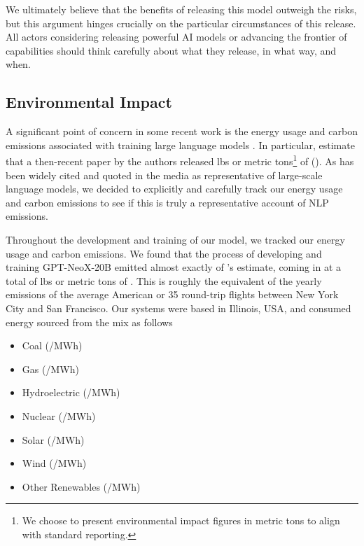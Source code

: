 \documentclass[11pt]{article}
\newcommand{\model}{GPT-NeoX-20B}
\begin{document}
We ultimately believe that the benefits of releasing this model outweigh the risks, but this argument hinges crucially on the particular circumstances of this release. All actors considering releasing powerful AI models or advancing the frontier of capabilities should think carefully about what they release, in what way, and when. 

\subsection{Environmental Impact}
\label{subsec:environmental-impact}

A significant point of concern in some recent work is the energy usage and carbon emissions associated with training large language models \citep{strubell2019energy,schwartz2020green,lacoste2019quantifying,bender2021dangers}. In particular, \citet{strubell2019energy} estimate that a then-recent paper by the authors released  lbs or  metric tons\footnote{We choose to present environmental impact figures in metric tons to align with standard reporting.} of  (). As \citet{strubell2019energy} has been widely cited and quoted in the media as representative of large-scale language models, we decided to explicitly and carefully track our energy usage and carbon emissions to see if this is truly a representative account of NLP emissions.

Throughout the development and training of our model, we tracked our energy usage and carbon emissions. We found that the process of developing and training \model{} emitted almost exactly  of \citet{strubell2019energy}'s estimate, coming in at a total of  lbs or  metric tons of . This is roughly the equivalent of the yearly emissions of the average American or 35 round-trip flights between New York City and San Francisco. Our systems were based in Illinois, USA, and consumed energy sourced from the mix as follows

\begin{itemize}
    \item  Coal (/MWh)
    \item  Gas (/MWh)
    \item  Hydroelectric (/MWh)
    \item  Nuclear (/MWh)
    \item  Solar (/MWh)
    \item  Wind (/MWh)
    \item  Other Renewables (/MWh)
\end{itemize}
\end{document}
